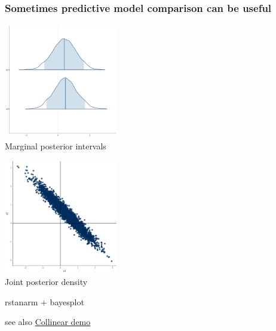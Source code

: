\documentclass[10pt]{beamer}
\begin{document}
\begin{frame}{}

\frametitle{Sometimes predictive model comparison can be useful}

      \begin{minipage}[t]{0.45\linewidth}
        \begin{center}
          \includegraphics[width=5cm]{figs/fitg2_xx_areas.pdf}\\
          Marginal posterior intervals
        \end{center}
      \end{minipage}
      \pause
      \begin{minipage}[t]{0.45\linewidth}
        \begin{center}
          \includegraphics[width=5cm]{figs/fitg2_xx_scatter.pdf}\\
          Joint posterior density
        \end{center}
      \end{minipage}

            \begin{center}
      {\scriptsize rstanarm + bayesplot}
    \end{center}

    \pause
    {\small
      see also \href{https://avehtari.github.io/modelselection/collinear.html}{Collinear demo}
    }

\end{frame}
\end{document}
